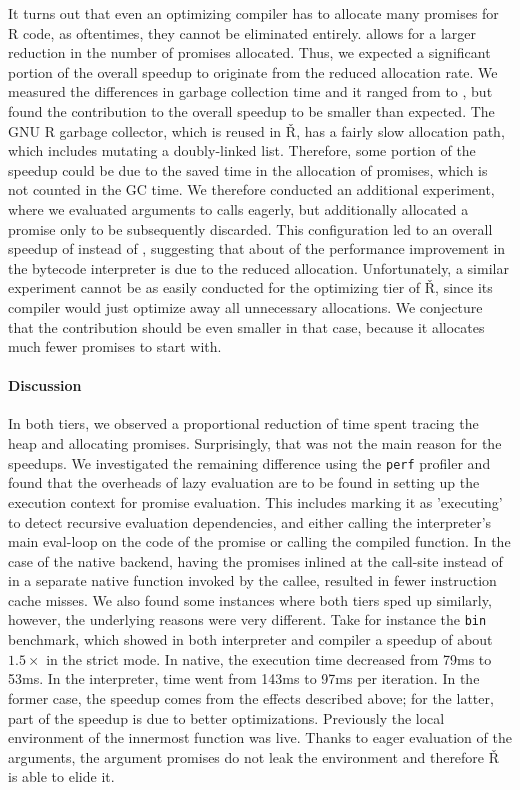 \documentclass[review,creen,acmsmall]{acmart}
\renewcommand{\Rsh}{{\sf\v R}\xspace}
\begin{document}
It turns out that even an optimizing compiler has to allocate many promises for
R code, as oftentimes, they cannot be eliminated entirely. \rshstrict allows for
a larger reduction in the number of promises allocated. Thus, we expected a
significant portion of the overall speedup to originate from the reduced
allocation rate. We measured the differences in garbage collection time and it
ranged from \speedupGCRshStrictMin to \speedupGCRshStrictMax, but found the
contribution to the overall speedup to be smaller than expected. The GNU R
garbage collector, which is reused in \Rsh, has a fairly slow allocation path,
which includes mutating a doubly-linked list. Therefore, some portion of the
speedup could be due to the saved time in the allocation of promises, which is
not counted in the GC time. We therefore conducted an additional experiment,
where we evaluated arguments to calls eagerly, but additionally allocated a
promise only to be subsequently discarded. This configuration led to an overall
speedup of \speedupBCRshStrictAlloc instead of \speedupBCRshStrict, suggesting
that about \speedupDueToReducedGC of the performance improvement in the bytecode
interpreter is due to the reduced allocation. Unfortunately, a similar
experiment cannot be as easily conducted for the optimizing tier of \Rsh, since
its compiler would just optimize away all unnecessary allocations. We conjecture
that the contribution should be even smaller in that case, because it allocates
much fewer promises to start with.

\paragraph{Discussion}

In both tiers, we observed a proportional reduction of time spent tracing the
heap and allocating promises. Surprisingly, that was not the main reason
for the speedups. We investigated the remaining difference using the
\lstinline{perf} profiler and found that the overheads of lazy evaluation are to
be found in setting up the execution context for promise evaluation. This
includes marking it as 'executing' to detect recursive evaluation dependencies,
and either calling the interpreter's main eval-loop on the code of the promise or
calling the compiled function. In the case of the native backend, having the
promises inlined at the call-site instead of in a separate native function
invoked by the callee, resulted in fewer instruction cache misses. We also found
some instances where both tiers sped up similarly, however, the underlying
reasons were very different. Take for instance the \lstinline{bin} benchmark,
which showed in both interpreter and compiler a speedup of about $1.5\times$ in
the strict mode. In native, the execution time decreased from 79ms to 53ms. In
the interpreter, time went from 143ms to 97ms per iteration. In the former case,
the speedup comes from the effects described above; for the latter, part of the
speedup is due to better optimizations. Previously the local environment of
the innermost function was live. Thanks to eager evaluation of the arguments,
the argument promises do not leak the environment and therefore \Rsh is able to
elide it.
\end{document}
